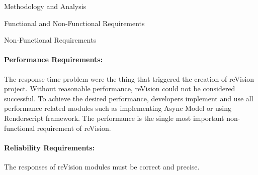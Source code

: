 \documentclass[12pt, a4paper]{article} \pagenumbering{gobble}
\begin{document}
\begin{section}{Methodology and Analysis}
\begin{subsection}{Functional and Non-Functional Requirements}
    \begin{subsubsection}{Non-Functional Requirements}
      \paragraph{Performance Requirements:}{
      The response time problem were the thing that triggered the creation of reVision project. Without reasonable
      performance, reVision could not be considered successful. To achieve the desired performance, developers implement
      and use all performance related modules such as implementing Async Model or using Renderscript framework. The
      performance is the single most important non-functional requirement of reVision.
      }
      ​
      \paragraph{Reliability Requirements:}{
      The responses of reVision modules must be correct and precise.
      }
      ​

\end{subsubsection}
\end{subsection}
\end{section}
\end{document}
